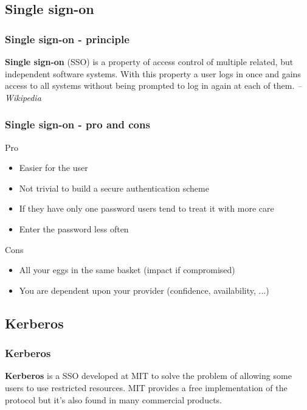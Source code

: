 \subsection{Single sign-on}

\begin{frame}
\frametitle{Single sign-on - principle}
\textbf{Single sign-on} (SSO) is a property of access control of multiple
related, but independent software systems. With this property a user
logs in once and gains access to all systems without being prompted to
log in again at each of them.
\textit{-- Wikipedia}
\end{frame}

\begin{frame}
\frametitle{Single sign-on - pro and cons}
\begin{block}{Pro}
\begin{itemize}
\item Easier for the user
\item Not trivial to build a secure authentication scheme
\item If they have only one password users tend to treat it with more care
\item Enter the password less often
\end{itemize}
\end{block}
\begin{block}{Cons}
\begin{itemize}
\item All your eggs in the same basket (impact if compromised)
\item You are dependent upon your provider (confidence, availability, ...)
\end{itemize}
\end{block}
\end{frame}

\subsection{Kerberos}

\begin{frame}
\frametitle{Kerberos}
\textbf{Kerberos} is a SSO developed at MIT to solve the problem of allowing
some users to use restricted resources.
MIT provides a free implementation of the protocol but it's also found in many
commercial products.
\end{frame}

